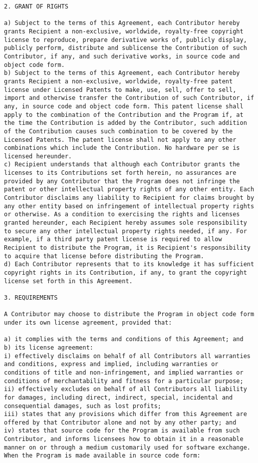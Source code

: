 \begin{verbatim}
2. GRANT OF RIGHTS 

a) Subject to the terms of this Agreement, each Contributor hereby
grants Recipient a non-exclusive, worldwide, royalty-free copyright
license to reproduce, prepare derivative works of, publicly display,
publicly perform, distribute and sublicense the Contribution of such
Contributor, if any, and such derivative works, in source code and
object code form. 
b) Subject to the terms of this Agreement, each Contributor hereby
grants Recipient a non-exclusive, worldwide, royalty-free patent
license under Licensed Patents to make, use, sell, offer to sell,
import and otherwise transfer the Contribution of such Contributor, if
any, in source code and object code form. This patent license shall
apply to the combination of the Contribution and the Program if, at
the time the Contribution is added by the Contributor, such addition
of the Contribution causes such combination to be covered by the
Licensed Patents. The patent license shall not apply to any other
combinations which include the Contribution. No hardware per se is
licensed hereunder. 
c) Recipient understands that although each Contributor grants the
licenses to its Contributions set forth herein, no assurances are
provided by any Contributor that the Program does not infringe the
patent or other intellectual property rights of any other entity. Each
Contributor disclaims any liability to Recipient for claims brought by
any other entity based on infringement of intellectual property rights
or otherwise. As a condition to exercising the rights and licenses
granted hereunder, each Recipient hereby assumes sole responsibility
to secure any other intellectual property rights needed, if any. For
example, if a third party patent license is required to allow
Recipient to distribute the Program, it is Recipient's responsibility
to acquire that license before distributing the Program. 
d) Each Contributor represents that to its knowledge it has sufficient
copyright rights in its Contribution, if any, to grant the copyright
license set forth in this Agreement.  

3. REQUIREMENTS 

A Contributor may choose to distribute the Program in object code form
under its own license agreement, provided that:  

a) it complies with the terms and conditions of this Agreement; and
b) its license agreement:
i) effectively disclaims on behalf of all Contributors all warranties
and conditions, express and implied, including warranties or
conditions of title and non-infringement, and implied warranties or
conditions of merchantability and fitness for a particular purpose;  
ii) effectively excludes on behalf of all Contributors all liability
for damages, including direct, indirect, special, incidental and
consequential damages, such as lost profits;  
iii) states that any provisions which differ from this Agreement are
offered by that Contributor alone and not by any other party; and 
iv) states that source code for the Program is available from such
Contributor, and informs licensees how to obtain it in a reasonable
manner on or through a medium customarily used for software exchange. 
When the Program is made available in source code form: 


\end{verbatim}
